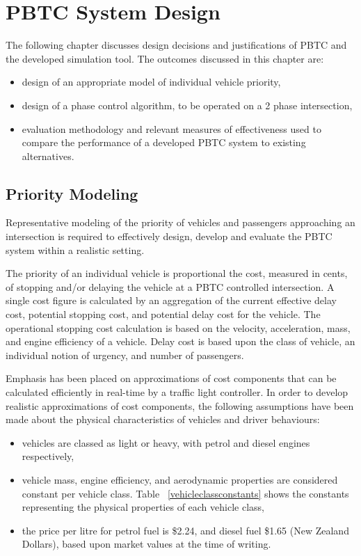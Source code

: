 \chapter{PBTC System Design}

The following chapter discusses design decisions and justifications of PBTC and the developed simulation tool. The outcomes discussed in this chapter are:

\begin{itemize}
\item design of an appropriate model of individual vehicle priority,
\item design of a phase control algorithm, to be operated on a 2 phase intersection,
\item evaluation methodology and relevant measures of effectiveness used to compare the performance of a developed PBTC system to existing alternatives.
\end{itemize}

\section{Priority Modeling}

Representative modeling of the priority of vehicles and passengers approaching an intersection is required to effectively design, develop and evaluate the PBTC system within a realistic setting. 

The priority of an individual vehicle is proportional the cost, measured in cents, of stopping and/or delaying the vehicle at a PBTC controlled intersection. A single cost figure is calculated by an aggregation of the current effective delay cost, potential stopping cost, and potential delay cost for the vehicle. The operational stopping cost calculation is based on the velocity, acceleration, mass, and engine efficiency of a vehicle. Delay cost is based upon the class of vehicle, an individual notion of urgency, and number of passengers.

Emphasis has been placed on approximations of cost components that can be calculated efficiently in real-time by a traffic light controller. In order to develop realistic approximations of cost components, the following assumptions have been made about the physical characteristics of vehicles and driver behaviours:

\begin{itemize}
\item vehicles are classed as light or heavy, with petrol and diesel engines respectively,
\item vehicle mass, engine efficiency, and aerodynamic properties are considered constant per vehicle class. Table ~\ref{vehicleclassconstants} shows the constants representing the physical properties of each vehicle class,
\item the price per litre for petrol fuel is \$2.24, and diesel fuel \$1.65 (New Zealand Dollars), based upon market values at the time of writing.
\end{itemize}

